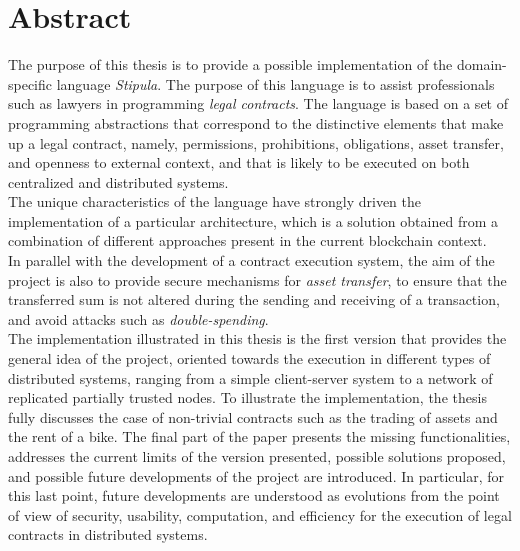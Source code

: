 
\cleardoublepage
{}
{}
\begingroup
\let\clearpage\relax
\let\cleardoublepage\relax
\let\cleardoublepage\relax

\chapter*{Abstract}

The purpose of this thesis is to provide a possible implementation of the domain-specific language 
\textit{Stipula}. The purpose of this language is to assist professionals such as lawyers in programming 
\textit{legal contracts}. The language is based on a set of programming abstractions that correspond to the 
distinctive elements that make up a legal contract, namely, permissions, prohibitions, obligations, asset 
transfer, and openness to external context, and that is likely to be executed on both centralized and 
distributed systems.\\
The unique characteristics of the language have strongly driven the implementation of a particular 
architecture, which is a solution obtained from a combination of different approaches present in the 
current blockchain context.\\
In parallel with the development of a contract execution system, the aim of the project is also to provide 
secure mechanisms for \textit{asset transfer}, to ensure that the transferred sum is not altered during 
the sending and receiving of a transaction, and avoid attacks such as \textit{double-spending}.\\
The implementation illustrated in this thesis is the first version that provides the general idea of the 
project, oriented towards the execution in different types of distributed systems, ranging from a simple 
client-server system to a network of replicated partially trusted nodes. To illustrate the implementation, 
the thesis fully discusses the case of non-trivial contracts such as the trading of assets and the rent of 
a bike. The final part of the paper presents the missing functionalities, addresses the current limits of 
the version presented, possible solutions proposed, and possible future developments of the project are 
introduced. In particular, for this last point, future developments are understood as evolutions from the 
point of view of security, usability, computation, and efficiency for the execution of legal contracts in 
distributed systems.

\endgroup			

\vfill
